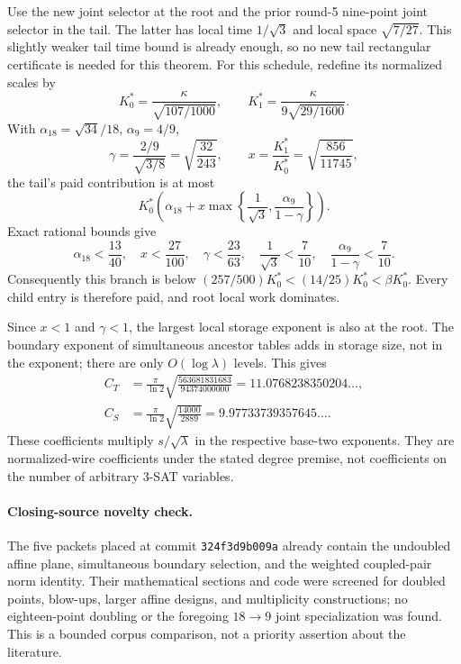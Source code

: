 Use the new joint selector at the root and the prior round-5 nine-point
joint selector in the tail. The latter has local time $1/\sqrt3$ and
local space $\sqrt{7/27}$. This slightly weaker tail time bound is already
enough, so no new tail rectangular certificate is needed for this theorem.
For this schedule, redefine its normalized scales by
\[
 K_0^*=\frac\kappa{\sqrt{107/1000}},\qquad
 K_1^*=\frac\kappa{9\sqrt{29/1600}}.
\]
With $\alpha_{18}=\sqrt{34}/18$, $\alpha_9=4/9$,
\[
 \gamma=\frac{2/9}{\sqrt{3/8}}=\sqrt{\frac{32}{243}},\qquad
 x=\frac{K_1^*}{K_0^*}=\sqrt{\frac{856}{11745}},
\]
the tail's paid contribution is at most
\[
 K_0^*\left(\alpha_{18}
      +x\max\left\{\frac1{\sqrt3},\frac{\alpha_9}{1-\gamma}\right\}\right).
\]
Exact rational bounds give
\[
 \alpha_{18}<\frac{13}{40},\quad
 x<\frac{27}{100},\quad
 \gamma<\frac{23}{63},\quad
 \frac1{\sqrt3}<\frac7{10},\quad
 \frac{\alpha_9}{1-\gamma}<\frac7{10}.
\]
Consequently this branch is below
$(257/500)K_0^*<(14/25)K_0^*<\beta K_0^*$.
Every child entry is therefore paid, and root local work dominates.

Since $x<1$ and $\gamma<1$, the largest local storage exponent is also at
the root. The boundary exponent of simultaneous ancestor tables adds in
storage size, not in the exponent; there are only $O(\log\lambda)$ levels.
This gives
\begin{align*}
 C_T&=\frac\pi{\ln2}\sqrt{\frac{563681831683}{94374000000}}
      =11.0768238350204\ldots,\\
 C_S&=\frac\pi{\ln2}\sqrt{\frac{14000}{2889}}
      =9.97733739357645\ldots.
\end{align*}
These coefficients multiply $s/\sqrt\lambda$ in the respective base-two
exponents. They are normalized-wire coefficients under the stated degree
premise, not coefficients on the number of arbitrary 3-SAT variables.

\paragraph{Closing-source novelty check.}
The five packets placed at commit
\texttt{324f3d9b009a} already contain the
undoubled affine plane, simultaneous boundary selection, and the weighted
coupled-pair norm identity. Their mathematical sections and code were
screened for doubled points, blow-ups, larger affine designs, and multiplicity
constructions; no eighteen-point doubling or the foregoing $18\to9$
joint specialization was found. This is a bounded corpus comparison,
not a priority assertion about the literature.

